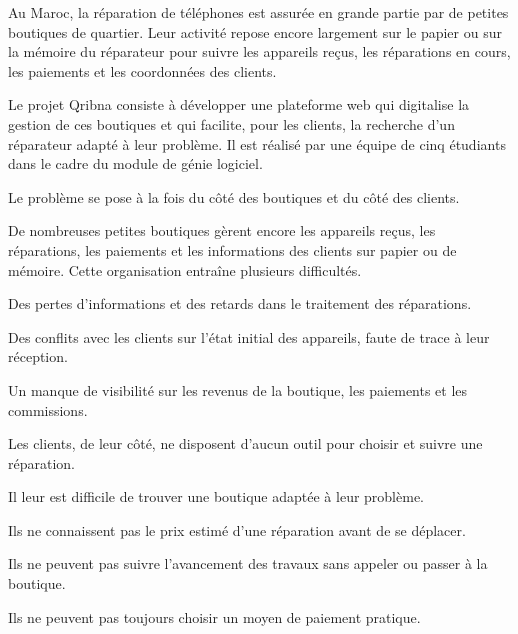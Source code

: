 


Au Maroc, la réparation de téléphones est assurée en grande partie par de petites boutiques de quartier. Leur activité repose encore largement sur le papier ou sur la mémoire du réparateur pour suivre les appareils reçus, les réparations en cours, les paiements et les coordonnées des clients.

Le projet Qribna consiste à développer une plateforme web qui digitalise la gestion de ces boutiques et qui facilite, pour les clients, la recherche d’un réparateur adapté à leur problème. Il est réalisé par une équipe de cinq étudiants dans le cadre du module de génie logiciel.


Le problème se pose à la fois du côté des boutiques et du côté des clients.


De nombreuses petites boutiques gèrent encore les appareils reçus, les réparations, les paiements et les informations des clients sur papier ou de mémoire. Cette organisation entraîne plusieurs difficultés.

\begin{cdcitems}
  \item Des pertes d’informations et des retards dans le traitement des réparations.
  \item Des conflits avec les clients sur l’état initial des appareils, faute de trace à leur réception.
  \item Un manque de visibilité sur les revenus de la boutique, les paiements et les commissions.
\end{cdcitems}


Les clients, de leur côté, ne disposent d’aucun outil pour choisir et suivre une réparation.

\begin{cdcitems}
  \item Il leur est difficile de trouver une boutique adaptée à leur problème.
  \item Ils ne connaissent pas le prix estimé d’une réparation avant de se déplacer.
  \item Ils ne peuvent pas suivre l’avancement des travaux sans appeler ou passer à la boutique.
  \item Ils ne peuvent pas toujours choisir un moyen de paiement pratique.
\end{cdcitems}

